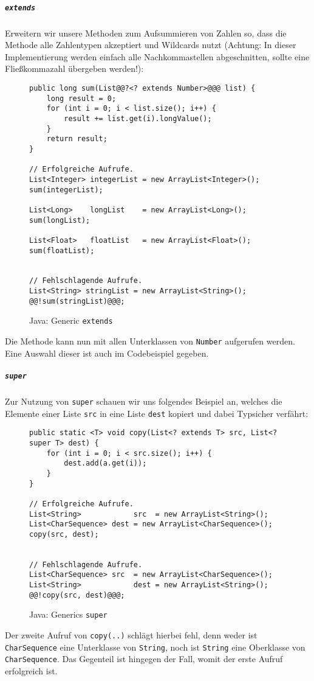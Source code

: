 			\subparagraph{\texttt{extends}}
				Erweitern wir unsere Methoden zum Aufsummieren von Zahlen so, dass die Methode alle Zahlentypen akzeptiert und Wildcards nutzt (Achtung: In dieser Implementierung werden einfach alle Nachkommastellen abgeschnitten, sollte eine Fließkommazahl übergeben werden!):
				\begin{figure}[H]
					\centering
					\begin{lstlisting}[style = base]
public long sum(List@@?<? extends Number>@@@ list) {
	long result = 0;
	for (int i = 0; i < list.size(); i++) {
		result += list.get(i).longValue();
	}
	return result;
}

// Erfolgreiche Aufrufe.
List<Integer> integerList = new ArrayList<Integer>();
sum(integerList);

List<Long>    longList    = new ArrayList<Long>();
sum(longList);

List<Float>   floatList   = new ArrayList<Float>();
sum(floatList);


// Fehlschlagende Aufrufe.
List<String> stringList = new ArrayList<String>();
@@!sum(stringList)@@@;
					\end{lstlisting}
					\caption{Java: Generic \texttt{extends}}
				\end{figure}
				Die Methode kann nun mit allen Unterklassen von \texttt{Number} aufgerufen werden. Eine Auswahl dieser ist auch im Codebeispiel gegeben.
			
			\subparagraph{\texttt{super}}
				Zur Nutzung von \texttt{super} schauen wir uns folgendes Beispiel an, welches die Elemente einer Liste \texttt{src} in eine Liste \texttt{dest} kopiert und dabei Typsicher verfährt:
				\begin{figure}[H]
					\centering
					\begin{lstlisting}[style = base]
public static <T> void copy(List<? extends T> src, List<? super T> dest) {
	for (int i = 0; i < src.size(); i++) {
		dest.add(a.get(i));
	}
}

// Erfolgreiche Aufrufe.
List<String>            src  = new ArrayList<String>();
List<CharSequence> dest = new ArrayList<CharSequence>();
copy(src, dest);


// Fehlschlagende Aufrufe.
List<CharSequence> src  = new ArrayList<CharSequence>();
List<String>            dest = new ArrayList<String>();
@@!copy(src, dest)@@@;
					\end{lstlisting}
					\caption{Java: Generics \texttt{super}}
				\end{figure}
				Der zweite Aufruf von \lstinline|copy(..)| schlägt hierbei fehl, denn weder ist \texttt{CharSequence} eine Unterklasse von \texttt{String}, noch ist \texttt{String} eine Oberklasse von \texttt{CharSequence}. Das Gegenteil ist hingegen der Fall, womit der erste Aufruf erfolgreich ist.
			
